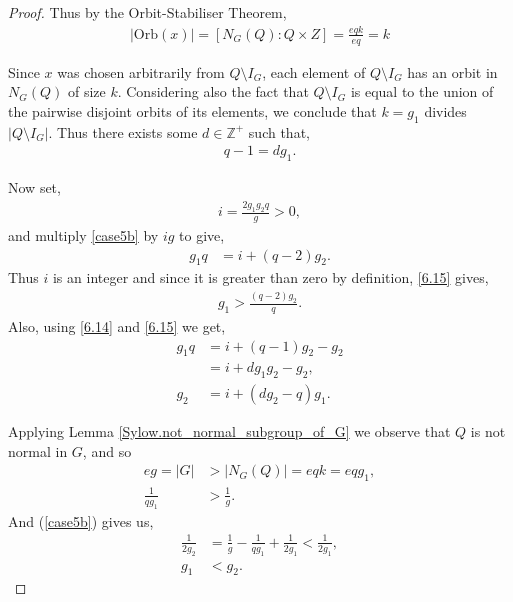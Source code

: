 \begin{proof}
Thus by the Orbit-Stabiliser Theorem,
\begin{align*} |\text{Orb}(x)| = [N_G(Q) : Q \times Z] = \frac{eqk}{eq} = k
\end{align*}

Since $x$ was chosen arbitrarily from $Q \! \setminus \! I_G$, each element of $Q \! \setminus \! I_G$ has an orbit in $N_G(Q)$ of size $k$. Considering also the fact that $Q \! \setminus \! I_G$ is equal to the union of the pairwise disjoint orbits of its elements, we conclude that $k = g_1$ divides $|Q \! \setminus \! I_G|$. Thus there exists some $d \in \mathbb{Z^+}$ such that,
\begin{align}\label{6.14} q-1 = d g_1.
\end{align}

Now set,
\begin{align} \label{6.14a} i = \frac{2 g_1 g_2 q}{g} > 0,
\end{align}
and multiply \eqref{case5b} by $ig$ to give,
\begin{align}\label{6.15} g_1 q &= i + (q-2) g_2.
\end{align}
Thus $i$ is an integer and since it is greater than zero by definition, \eqref{6.15} gives,
\begin{align}\label{6.16b} g_1 > \frac{(q-2) g_2}{q}.
\end{align}
Also, using \eqref{6.14} and \eqref{6.15} we get,
\begin{align}\label{6.16a} g_1 q &= i + (q-1) g_2 - g_2 \nonumber
\\ &= i + d g_1 g_2 - g_2, \nonumber
\\ g_2 &= i + (d g_2 - q) g_1.
\end{align}

Applying Lemma \ref{Sylow.not_normal_subgroup_of_G} we observe that $Q$ is not normal in $G$, and so 
\begin{align*} eg = |G| &> |N_G(Q)| = eqk = eqg_1, \\[1.5ex]
\frac{1}{qg_1} &> \frac{1}{g}.
\end{align*}
And (\ref{case5b}) gives us,
\begin{align}\label{6.13}  \frac{1}{2g_2} &= \frac{1}{g} - \frac{1}{qg_1} + \frac{1}{2g_1} < \frac{1}{2g_1}, \nonumber
\\[1.5ex] g_1 &< g_2.
\end{align}


\end{proof}
